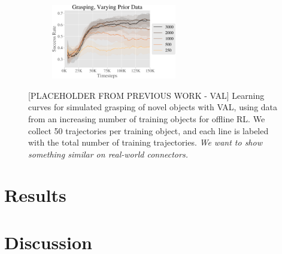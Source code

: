 \documentclass[letterpaper, 10 pt, conference, final]{ieeeconf}   %
\begin{document}
\begin{figure}[t]
    \centering
    \begin{subfigure}[b]{0.99\linewidth}
        \center
        \includegraphics[width=0.6\textwidth]{imgs/vary_data-crop.pdf}
    \end{subfigure}

    \caption{[PLACEHOLDER FROM PREVIOUS WORK - VAL] Learning curves for simulated grasping of novel objects with VAL, using data from an increasing number of training objects for offline RL. We collect 50 trajectories per training object, and each line is labeled with the total number of training trajectories. \textit{We want to show something similar on real-world connectors.} }

    \label{fig:novel_obj}
    \vspace{-0.5cm}
\end{figure}

\section{Results}

\section{Discussion}



{ \small
% 


}
\end{document}
